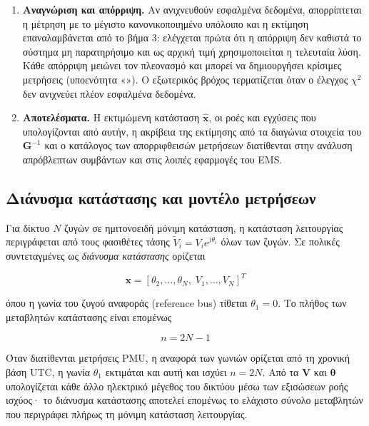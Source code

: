 \begin{enumerate}
      $\chi^2$.
\item \textbf{Αναγνώριση και απόρριψη.} Αν ανιχνευθούν εσφαλμένα δεδομένα, απορρίπτεται η
      μέτρηση με το μέγιστο κανονικοποιημένο υπόλοιπο και η εκτίμηση επαναλαμβάνεται από το
      βήμα 3: ελέγχεται πρώτα ότι η απόρριψη δεν καθιστά το σύστημα μη παρατηρήσιμο και ως
      αρχική τιμή χρησιμοποιείται η τελευταία λύση. Κάθε απόρριψη μειώνει τον πλεονασμό
      και μπορεί να δημιουργήσει κρίσιμες μετρήσεις (υποενότητα «»). Ο εξωτερικός
      βρόχος τερματίζεται όταν ο έλεγχος $\chi^2$ δεν ανιχνεύει πλέον εσφαλμένα δεδομένα.
\item \textbf{Αποτελέσματα.} Η εκτιμώμενη κατάσταση $\hat{\mathbf{x}}$, οι ροές και εγχύσεις
      που υπολογίζονται από αυτήν, η ακρίβεια της εκτίμησης από τα διαγώνια στοιχεία του
      $\mathbf{G}^{-1}$ και ο κατάλογος των απορριφθεισών μετρήσεων διατίθενται στην ανάλυση
      απρόβλεπτων συμβάντων και στις λοιπές εφαρμογές του EMS.
\end{enumerate}

\subsection{Διάνυσμα κατάστασης και μοντέλο μετρήσεων}

Για δίκτυο $N$ ζυγών σε ημιτονοειδή μόνιμη κατάσταση, η κατάσταση λειτουργίας περιγράφεται από
τους φασιθέτες τάσης $\tilde{V}_i = V_i e^{j\theta_i}$ όλων των ζυγών. Σε πολικές συντεταγμένες
ως \emph{διάνυσμα κατάστασης} ορίζεται

\begin{equation}
\mathbf{x} = \left[\theta_2, \ldots, \theta_N,\; V_1, \ldots, V_N\right]^{T}
\label{eq:statevec}
\end{equation}

όπου η γωνία του ζυγού αναφοράς (reference bus) τίθεται $\theta_1 = 0$. Το πλήθος των
μεταβλητών κατάστασης είναι επομένως

\begin{equation}
n = 2N - 1
\label{eq:nstates}
\end{equation}

Όταν διατίθενται μετρήσεις PMU, η αναφορά των γωνιών ορίζεται από τη χρονική βάση UTC, η
γωνία $\theta_1$ εκτιμάται και αυτή και ισχύει $n = 2N$. Από τα $\mathbf{V}$ και
$\boldsymbol{\theta}$ υπολογίζεται κάθε άλλο ηλεκτρικό μέγεθος του δικτύου μέσω των εξισώσεων
ροής ισχύος· το διάνυσμα κατάστασης αποτελεί επομένως το ελάχιστο σύνολο μεταβλητών που
περιγράφει πλήρως τη μόνιμη κατάσταση λειτουργίας.

